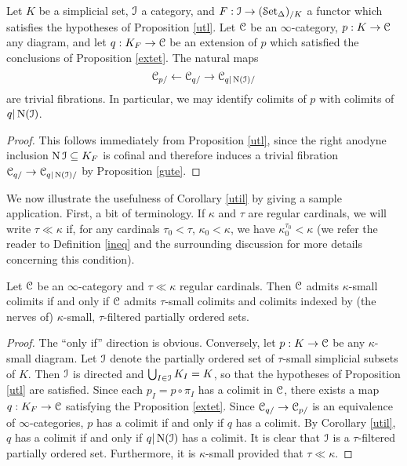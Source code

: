 \begin{corollary}\label{util}
Let $K$ be a simplicial set, $\operatorname{\mathcal{I}}$ a category, and $F: \operatorname{\mathcal{I}} \rightarrow (\operatorname{\mathcal{S}et_{\Delta}})_{/K}$ a functor which satisfies the hypotheses of Proposition \ref{utl}. Let $\operatorname{\mathcal{C}}$ be an $\infty$-category, $p: K \rightarrow \operatorname{\mathcal{C}}$ any diagram, and let $q: K_{F} \rightarrow \operatorname{\mathcal{C}}$ be an extension of $p$ which satisfied the conclusions of Proposition \ref{extet}. The natural maps
$$ \operatorname{\mathcal{C}}_{p/} \leftarrow \operatorname{\mathcal{C}}_{q/} \rightarrow \operatorname{\mathcal{C}}_{q | \operatorname{N}(\operatorname{\mathcal{I}})/}$$ are trivial fibrations.
In particular, we may identify colimits of $p$ with colimits of $q| \operatorname{N}(\operatorname{\mathcal{I}})$.
\end{corollary}

\begin{proof}
This follows immediately from Proposition \ref{utl}, since the right anodyne inclusion
$\operatorname{N} \operatorname{\mathcal{I}} \subseteq K_{F}$ is cofinal and therefore induces a trivial fibration $\operatorname{\mathcal{C}}_{q/} \rightarrow \operatorname{\mathcal{C}}_{q|\operatorname{N}(\operatorname{\mathcal{I}})/}$ by Proposition \ref{gute}.
\end{proof}

We now illustrate the usefulness of Corollary \ref{util} by giving a sample application. First, a bit of terminology. If $\kappa$ and $\tau$ are regular cardinals, we will write $\tau \ll \kappa$ if, for any cardinals $\tau_0 < \tau$, $\kappa_0 < \kappa$, we have $\kappa_0^{\tau_0} < \kappa$ (we refer the reader to Definition \ref{ineq} and the surrounding discussion for more details concerning this condition).

\begin{corollary}\label{uterrr}
Let $\operatorname{\mathcal{C}}$ be an $\infty$-category and $\tau \ll \kappa$ regular cardinals. Then
$\operatorname{\mathcal{C}}$ admits $\kappa$-small colimits if and only if $\operatorname{\mathcal{C}}$ admits $\tau$-small
colimits and colimits indexed by (the nerves of) $\kappa$-small, $\tau$-filtered partially ordered sets.
\end{corollary}

\begin{proof}
The ``only if'' direction is obvious. Conversely, let $p: K
\rightarrow \operatorname{\mathcal{C}}$ be any $\kappa$-small diagram. Let $\operatorname{\mathcal{I}}$ denote the partially
ordered set of $\tau$-small simplicial subsets of $K$. Then
$\operatorname{\mathcal{I}}$ is directed and $\bigcup_{I \in \operatorname{\mathcal{I}}} K_I = K$, so that the hypotheses of
Proposition \ref{utl} are satisfied. Since each $p_I = p \circ \pi_I$ has a colimit
in $\operatorname{\mathcal{C}}$, there exists a map $q: K_{F} \rightarrow \operatorname{\mathcal{C}}$ satisfying the Proposition \ref{extet}.
Since $\operatorname{\mathcal{C}}_{q/} \rightarrow \operatorname{\mathcal{C}}_{p/}$ is an equivalence of $\infty$-categories, $p$ has a colimit if and only if $q$ has a colimit. By Corollary \ref{util}, $q$ has a colimit if and only if
$q| \operatorname{N}(\operatorname{\mathcal{I}})$ has a colimit. It is clear that $\operatorname{\mathcal{I}}$ is a $\tau$-filtered partially ordered set.
Furthermore, it is $\kappa$-small provided that $\tau \ll \kappa$.
\end{proof}

